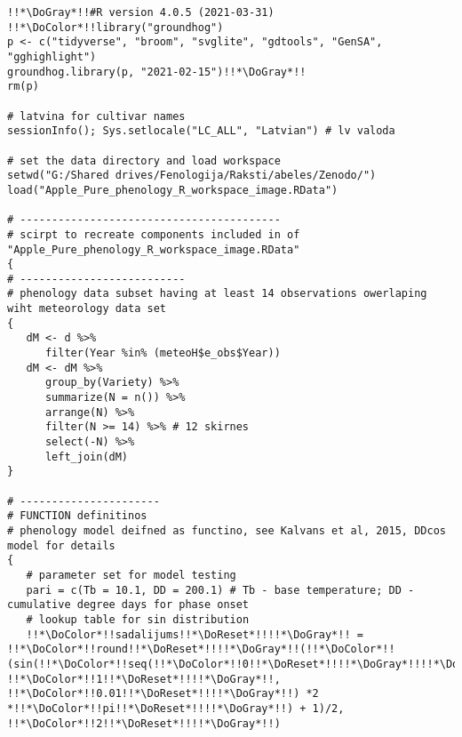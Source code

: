 
\usepackage{xxcolor}
\soldisablenumhl

\preview\footnotesize
\HookColor
\begin{verbatim}
!!*\DoGray*!!#R version 4.0.5 (2021-03-31)
!!*\DoColor*!!library("groundhog")
p <- c("tidyverse", "broom", "svglite", "gdtools", "GenSA", "gghighlight")
groundhog.library(p, "2021-02-15")!!*\DoGray*!!
rm(p)

# latvina for cultivar names
sessionInfo(); Sys.setlocale("LC_ALL", "Latvian") # lv valoda

# set the data directory and load workspace
setwd("G:/Shared drives/Fenologija/Raksti/abeles/Zenodo/")
load("Apple_Pure_phenology_R_workspace_image.RData")

# -----------------------------------------
# scirpt to recreate components included in of "Apple_Pure_phenology_R_workspace_image.RData"
{
# --------------------------
# phenology data subset having at least 14 observations owerlaping wiht meteorology data set
{
   dM <- d %>%
      filter(Year %in% (meteoH$e_obs$Year))
   dM <- dM %>%
      group_by(Variety) %>%
      summarize(N = n()) %>%
      arrange(N) %>%
      filter(N >= 14) %>% # 12 skirnes
      select(-N) %>%
      left_join(dM)
}

# ----------------------
# FUNCTION definitinos
# phenology model deifned as functino, see Kalvans et al, 2015, DDcos model for details
{
   # parameter set for model testing
   pari = c(Tb = 10.1, DD = 200.1) # Tb - base temperature; DD - cumulative degree days for phase onset
   # lookup table for sin distribution
   !!*\DoColor*!!sadalijums!!*\DoReset*!!!!*\DoGray*!! = !!*\DoColor*!!round!!*\DoReset*!!!!*\DoGray*!!(!!*\DoColor*!!(sin(!!*\DoColor*!!seq(!!*\DoColor*!!0!!*\DoReset*!!!!*\DoGray*!!!!*\DoReset*!!!!*\DoGray*!!, !!*\DoColor*!!1!!*\DoReset*!!!!*\DoGray*!!, !!*\DoColor*!!0.01!!*\DoReset*!!!!*\DoGray*!!) *2 *!!*\DoColor*!!pi!!*\DoReset*!!!!*\DoGray*!!) + 1)/2, !!*\DoColor*!!2!!*\DoReset*!!!!*\DoGray*!!)


\end{verbatim}
